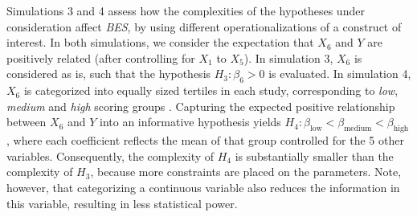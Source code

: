 \documentclass[review, 3p, authoryear]{elsarticle} %
\begin{document}
Simulations 3 and 4 assess how the complexities of the hypotheses under consideration affect \emph{BES}, by using different operationalizations of a construct of interest.
In both simulations, we consider the expectation that \(X_6\) and \(Y\) are positively related (after controlling for \(X_1\) to \(X_5\)).
In simulation 3, \(X_6\) is considered as is, such that the hypothesis \(H_3: \beta_6 > 0\) is evaluated.
In simulation 4, \(X_6\) is categorized into equally sized tertiles in each study, corresponding to \emph{low}, \emph{medium} and \emph{high} scoring groups \citep[which is, despite advice against this procedure, common practice in many areas of research; e.g.,][]{bennette_against_2012, decoster_best_2011}.
Capturing the expected positive relationship between \(X_6\) and \(Y\) into an informative hypothesis yields \(H_4: \beta_{\text{low}} < \beta_{\text{medium}} < \beta_{\text{high}}\), where each coefficient reflects the mean of that group controlled for the 5 other variables.
Consequently, the complexity of \(H_4\) is substantially smaller than the complexity of \(H_3\), because more constraints are placed on the parameters.
Note, however, that categorizing a continuous variable also reduces the information in this variable, resulting in less statistical power.
\end{document}
